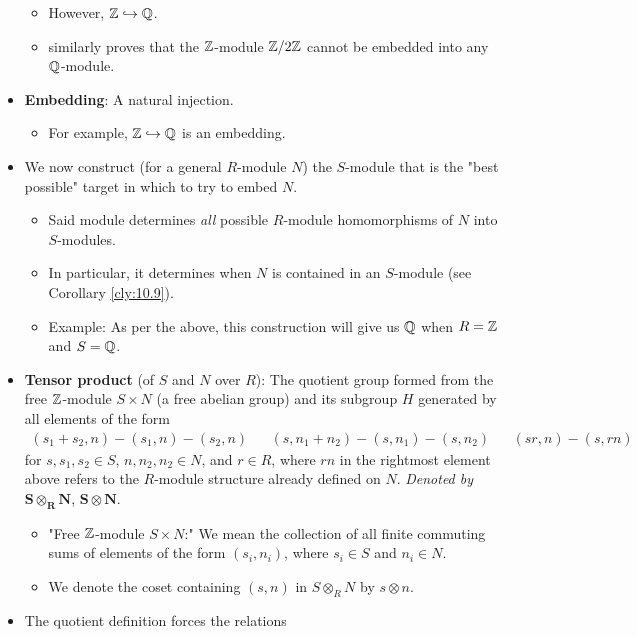 \documentclass[../notes.tex]{subfiles}
\begin{document}
\begin{itemize}
\begin{itemize}
        \item However, $\mathbb{Z}\hookrightarrow\mathbb{Q}$.
        \item \textcite{bib:DummitFoote} similarly proves that the $\mathbb{Z}$-module $\mathbb{Z}/2\mathbb{Z}$ cannot be embedded into any $\mathbb{Q}$-module.
    \end{itemize}
    \item \textbf{Embedding}: A natural injection.
    \begin{itemize}
        \item For example, $\mathbb{Z}\hookrightarrow\mathbb{Q}$ is an embedding.
    \end{itemize}
    \item We now construct (for a general $R$-module $N$) the $S$-module that is the "best possible" target in which to try to embed $N$.
    \begin{itemize}
        \item Said module determines \emph{all} possible $R$-module homomorphisms of $N$ into $S$-modules.
        \item In particular, it determines when $N$ is contained in an $S$-module (see Corollary \ref{cly:10.9}).
        \item Example: As per the above, this construction will give us $\mathbb{Q}$ when $R=\mathbb{Z}$ and $S=\mathbb{Q}$.
    \end{itemize}
    \item \textbf{Tensor product} (of $S$ and $N$ over $R$): The quotient group formed from the free $\mathbb{Z}$-module $S\times N$ (a free abelian group) and its subgroup $H$ generated by all elements of the form
    \begin{align*}
        (s_1+s_2,n)-(s_1,n)-(s_2,n)&&
        (s,n_1+n_2)-(s,n_1)-(s,n_2)&&
        (sr,n)-(s,rn)
    \end{align*}
    for $s,s_1,s_2\in S$, $n,n_2,n_2\in N$, and $r\in R$, where $rn$ in the rightmost element above refers to the $R$-module structure already defined on $N$. \emph{Denoted by} $\bm{S\otimes_RN}$, $\bm{S\otimes N}$.
    \begin{itemize}
        \item "Free $\mathbb{Z}$-module $S\times N$:" We mean the collection of all finite commuting sums of elements of the form $(s_i,n_i)$, where $s_i\in S$ and $n_i\in N$.
        \item We denote the coset containing $(s,n)$ in $S\otimes_RN$ by $s\otimes n$.
    \end{itemize}
    \item The quotient definition forces the relations
    \begin{align*}

\end{align*}
\end{itemize}
\end{document}
